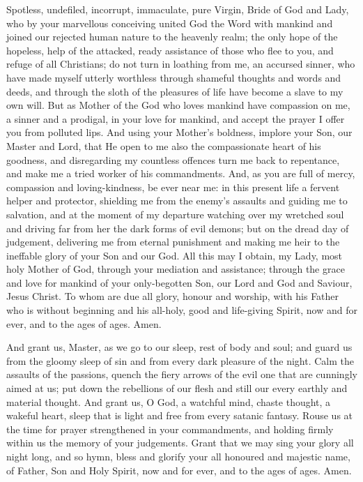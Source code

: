 Spotless, undefiled, incorrupt, immaculate, pure Virgin, Bride of God and Lady,
who by your marvellous conceiving united God the Word with mankind and joined our
rejected human nature to the heavenly realm; the only hope of the hopeless,
help of the attacked, ready assistance of those who flee to you, and refuge of all Christians;
do not turn in loathing from me, an accursed sinner,
who have made myself utterly worthless through shameful thoughts and words and deeds,
and through the sloth of the pleasures of life have become a slave to my own will.
But as Mother of the God who loves mankind have compassion on me, a sinner and a prodigal,
in your love for mankind, and accept the prayer I offer you from polluted lips.
And using your Mother's boldness, implore your Son, our Master and Lord,
that He open to me also the compassionate heart of his goodness,
and disregarding my countless offences turn me back to repentance,
and make me a tried worker of his commandments. And, as you are full of mercy,
compassion and loving-kindness, be ever near me: in this present life a fervent helper and protector,
shielding me from the enemy's assaults and guiding me to salvation,
and at the moment of my departure watching over my wretched soul
and driving far from her the dark forms of evil demons;
but on the dread day of judgement, delivering me from eternal punishment
and making me heir to the ineffable glory of your Son and our God.
All this may I obtain, my Lady, most holy Mother of God, through your mediation and assistance;
through the grace and love for mankind of your only-begotten Son,
our Lord and God and Saviour, Jesus Christ. To whom are due all glory, honour and worship,
with his Father who is without beginning and his all-holy, good and life-giving Spirit,
now and for ever, and to the ages of ages. Amen.


And grant us, Master, as we go to our sleep, rest of body and soul;
and guard us from the gloomy sleep of sin and from every dark pleasure of the night.
Calm the assaults of the passions, quench the fiery arrows of the evil one that are cunningly aimed at us;
put down the rebellions of our flesh and still our every earthly and material thought.
And grant us, O God, a watchful mind, chaste thought, a wakeful heart,
sleep that is light and free from every satanic fantasy.
Rouse us at the time for prayer strengthened in your commandments,
and holding firmly within us the memory of your judgements.
Grant that we may sing your glory all night long, and so hymn,
bless and glorify your all honoured and majestic name, of Father,
Son and Holy Spirit, now and for ever, and to the ages of ages. Amen.

